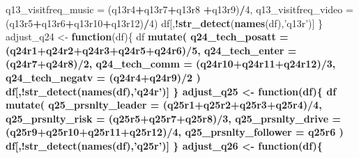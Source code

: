 \documentclass[]{article}
\newenvironment{Shaded}{\begin{snugshade}}{\end{snugshade}}
\newcommand{\KeywordTok}[1]{\textcolor[rgb]{0.13,0.29,0.53}{\textbf{#1}}}
\newcommand{\DataTypeTok}[1]{\textcolor[rgb]{0.13,0.29,0.53}{#1}}
\newcommand{\DecValTok}[1]{\textcolor[rgb]{0.00,0.00,0.81}{#1}}
\newcommand{\StringTok}[1]{\textcolor[rgb]{0.31,0.60,0.02}{#1}}
\newcommand{\ControlFlowTok}[1]{\textcolor[rgb]{0.13,0.29,0.53}{\textbf{#1}}}
\newcommand{\OperatorTok}[1]{\textcolor[rgb]{0.81,0.36,0.00}{\textbf{#1}}}
\newcommand{\NormalTok}[1]{#1}
\begin{document}
\begin{Shaded}
\begin{Highlighting}[]
{{           \DataTypeTok{q13_visitfreq_music =}\NormalTok{ (q13r4}\OperatorTok{+}\NormalTok{q13r7}\OperatorTok{+}\NormalTok{q13r8 }\OperatorTok{+}\NormalTok{q13r9)}\OperatorTok{/}\DecValTok{4}\NormalTok{,}
           \DataTypeTok{q13_visitfreq_video =}\NormalTok{ (q13r5}\OperatorTok{+}\NormalTok{q13r6}\OperatorTok{+}\NormalTok{q13r10}\OperatorTok{+}\NormalTok{q13r12)}\OperatorTok{/}\DecValTok{4}\NormalTok{)}
\NormalTok{  df[,}\OperatorTok{!}\KeywordTok{str_detect}\NormalTok{(}\KeywordTok{names}\NormalTok{(df),}\StringTok{'q13r'}\NormalTok{)]}
\NormalTok{\}}
\NormalTok{adjust_q24 <-}\StringTok{ }\ControlFlowTok{function}\NormalTok{(df)\{}
\NormalTok{  df }\OperatorTok{%<>%}\StringTok{ }
\StringTok{    }\KeywordTok{mutate}\NormalTok{(}
      \DataTypeTok{q24_tech_posatt =}\NormalTok{ (q24r1}\OperatorTok{+}\NormalTok{q24r2}\OperatorTok{+}\NormalTok{q24r3}\OperatorTok{+}\NormalTok{q24r5}\OperatorTok{+}\NormalTok{q24r6)}\OperatorTok{/}\DecValTok{5}\NormalTok{,}
      \DataTypeTok{q24_tech_enter =}\NormalTok{ (q24r7}\OperatorTok{+}\NormalTok{q24r8)}\OperatorTok{/}\DecValTok{2}\NormalTok{,}
      \DataTypeTok{q24_tech_comm =}\NormalTok{ (q24r10}\OperatorTok{+}\NormalTok{q24r11}\OperatorTok{+}\NormalTok{q24r12)}\OperatorTok{/}\DecValTok{3}\NormalTok{,}
      \DataTypeTok{q24_tech_negatv =}\NormalTok{ (q24r4}\OperatorTok{+}\NormalTok{q24r9)}\OperatorTok{/}\DecValTok{2}
\NormalTok{    )}
\NormalTok{  df[,}\OperatorTok{!}\KeywordTok{str_detect}\NormalTok{(}\KeywordTok{names}\NormalTok{(df),}\StringTok{'q24r'}\NormalTok{)]}
\NormalTok{\}}
\NormalTok{adjust_q25 <-}\StringTok{ }\ControlFlowTok{function}\NormalTok{(df)\{}
\NormalTok{  df }\OperatorTok{%<>%}\StringTok{ }
\StringTok{    }\KeywordTok{mutate}\NormalTok{(}
      \DataTypeTok{q25_prsnlty_leader =}\NormalTok{ (q25r1}\OperatorTok{+}\NormalTok{q25r2}\OperatorTok{+}\NormalTok{q25r3}\OperatorTok{+}\NormalTok{q25r4)}\OperatorTok{/}\DecValTok{4}\NormalTok{,}
      \DataTypeTok{q25_prsnlty_risk   =}\NormalTok{ (q25r5}\OperatorTok{+}\NormalTok{q25r7}\OperatorTok{+}\NormalTok{q25r8)}\OperatorTok{/}\DecValTok{3}\NormalTok{,}
      \DataTypeTok{q25_prsnlty_drive  =}\NormalTok{ (q25r9}\OperatorTok{+}\NormalTok{q25r10}\OperatorTok{+}\NormalTok{q25r11}\OperatorTok{+}\NormalTok{q25r12)}\OperatorTok{/}\DecValTok{4}\NormalTok{,}
      \DataTypeTok{q25_prsnlty_follower =}\NormalTok{ q25r6}
\NormalTok{    )}
\NormalTok{  df[,}\OperatorTok{!}\KeywordTok{str_detect}\NormalTok{(}\KeywordTok{names}\NormalTok{(df),}\StringTok{'q25r'}\NormalTok{)]}
\NormalTok{\}}
\NormalTok{adjust_q26 <-}\StringTok{ }\ControlFlowTok{function}\NormalTok{(df)\{}
}}}}
\end{Highlighting}
\end{Shaded}
\end{document}
